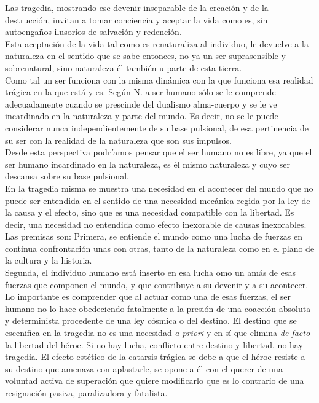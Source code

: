 \documentclass[a4paper, 10pt, twocolumn, spanish]{article}
\begin{document}
Las tragedia, mostrando ese devenir inseparable de la creación y de la
destrucción, invitan a tomar conciencia y aceptar la vida como es, sin
autoengaños ilusorios de salvación y redención.\\[0pt]
Esta aceptación de la vida tal como es renaturaliza al individuo, le
devuelve a la naturaleza en el sentido que se sabe entonces, no ya un
ser suprasensible y sobrenatural, sino naturaleza él también u parte
de esta tierra.\\[0pt]
Como tal un ser funciona con la misma dinámica con la que funciona esa
realidad trágica en la que está y es. Según N. a ser humano sólo se le
comprende adecuadamente cuando se prescinde del dualismo alma-cuerpo y
se le ve incardinado en la naturaleza y parte del mundo. Es decir, no
se le puede considerar nunca independientemente de su base pulsional,
de esa pertinencia de su ser con la realidad de la naturaleza que son
sus impulsos.\\[0pt]

Desde esta perspectiva podríamos pensar que el ser humano no es libre,
ya que el ser humano incardinado en la naturaleza, es él mismo
naturaleza y cuyo ser descansa sobre su base pulsional.\\[0pt]
En la tragedia misma se muestra una necesidad en el acontecer del
mundo que no puede ser entendida en el sentido de una necesidad
mecánica regida por la ley de la causa y el efecto, sino que es una
necesidad compatible con la libertad. Es decir, una necesidad no
entendida como efecto inexorable de causas inexorables.\\[0pt]
Las premisas son: Primera, se entiende el mundo como una lucha de
fuerzas en continua confrontación unas con otras, tanto de la
naturaleza como en el plano de la cultura y la historia.\\[0pt]
Segunda, el individuo humano está inserto en esa lucha omo un amás de
esas fuerzas que componen el mundo, y que contribuye a su devenir y a
su acontecer.\\[0pt]
Lo importante es comprender que al actuar como una de esas fuerzas, el
ser humano no lo hace obedeciendo fatalmente a la presión de una
coacción absoluta y determinista procedente de una ley cósmica o del
destino. El destino que se escenifica en la tragedia no es una
necesidad \emph{a priori} y en sí que elimina \emph{de facto} la libertad del
héroe. Si no hay lucha, conflicto entre destino y libertad, no hay
tragedia. El efecto estético de la catarsis trágica se debe a que el
héroe resiste a su destino que amenaza con aplastarle, se opone a él
con el querer de una voluntad activa de superación que quiere
modificarlo que es lo contrario de una resignación pasiva,
paralizadora y fatalista.\\[0pt]
\end{document}
